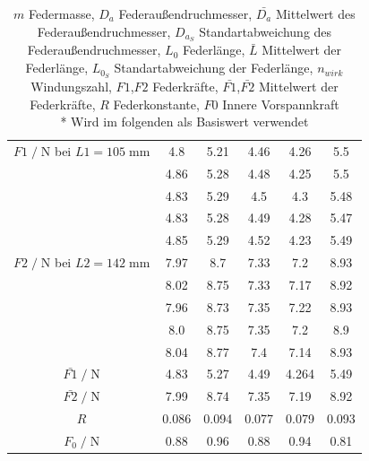 \begin{table}[H]
\begin{tabular}{c | c c c c c}
        $F1\;/\;$N bei $L1=105\;$mm & 4.8 & 5.21 & 4.46 & 4.26 & 5.5\\
                         & 4.86 & 5.28 & 4.48 & 4.25 & 5.5\\
                         & 4.83 & 5.29 & 4.5 & 4.3 & 5.48\\
                         & 4.83 & 5.28 & 4.49 & 4.28 & 5.47\\
                         & 4.85 & 5.29 & 4.52 & 4.23 & 5.49\\
        \midrule
        $F2\;/\;$N bei $L2=142\;$mm & 7.97 & 8.7 & 7.33 & 7.2 & 8.93\\
                         & 8.02 & 8.75 & 7.33 & 7.17 & 8.92\\
                         & 7.96 & 8.73 & 7.35 & 7.22 & 8.93\\
                         & 8.0 & 8.75 & 7.35 & 7.2 & 8.9\\
                         & 8.04 & 8.77 & 7.4 & 7.14 & 8.93\\
        \midrule
        $\bar{F1}\;/\;$N & 4.83 & 5.27 & 4.49 & 4.264 & 5.49\\
        $\bar{F2}\;/\;$N & 7.99 & 8.74 & 7.35 & 7.19 & 8.92\\
        \midrule
        $R$ & 0.086 & 0.094 & 0.077 & 0.079 & 0.093\\
        \midrule
        $F_0\;/\;$N & 0.88 & 0.96 & 0.88 & 0.94 & 0.81\\ 
        \bottomrule
    \end{tabular}
    \caption{$m$ Federmasse,
             $D_a$ Federaußendruchmesser, 
             $\bar{D_a}$ Mittelwert des Federaußendruchmesser, 
             $D_{a_S}$ Standartabweichung des Federaußendruchmesser,
             $L_0$ Federlänge,
             $\bar{L}$ Mittelwert der Federlänge,
             $L_{0_S}$ Standartabweichung der Federlänge,
             $n_{wirk}$ Windungszahl,
             $F1$,$F2$ Federkräfte,
             $\bar{F1}$,$\bar{F2}$ Mittelwert der Federkräfte,
             $R$ Federkonstante,
             $F0$ Innere Vorspannkraft\\
             * Wird im folgenden als Basiswert verwendet
    }
    \label{tab:Wertetabelle}
\end{table}


